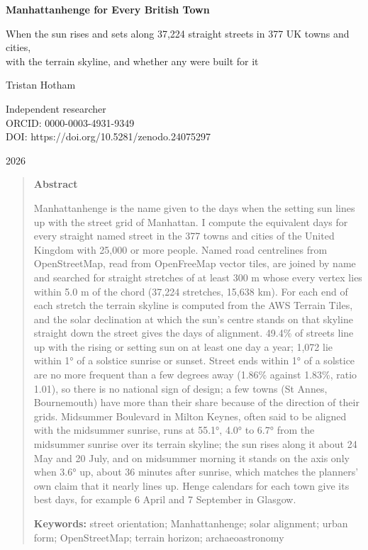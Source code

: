 \documentclass[11pt,a4paper]{article}
\begin{document}
\begin{center}
{\Large\bfseries Manhattanhenge for Every British Town\par}
\vspace{0.4em}
{\large When the sun rises and sets along 37,224 straight streets in 377 UK towns and cities,\\with the terrain skyline, and whether any were built for it\par}
\vspace{1.2em}
{\large Tristan Hotham\par}
\vspace{0.3em}
{\small Independent researcher\\
ORCID: 0000-0003-4931-9349\\
DOI: https://doi.org/10.5281/zenodo.24075297\par}
\vspace{0.8em}
2026
\end{center}

\begin{quote}
\small
\begin{center}\textbf{Abstract}\end{center}
Manhattanhenge is the name given to the days when the setting sun lines up with the street grid of Manhattan. I compute the equivalent days for every straight named street in the 377 towns and cities of the United Kingdom with 25,000 or more people. Named road centrelines from OpenStreetMap, read from OpenFreeMap vector tiles, are joined by name and searched for straight stretches of at least 300 m whose every vertex lies within 5.0 m of the chord (37,224 stretches, 15,638 km). For each end of each stretch the terrain skyline is computed from the AWS Terrain Tiles, and the solar declination at which the sun's centre stands on that skyline straight down the street gives the days of alignment. 49.4\% of streets line up with the rising or setting sun on at least one day a year; 1,072 lie within 1° of a solstice sunrise or sunset. Street ends within 1° of a solstice are no more frequent than a few degrees away (1.86\% against 1.83\%, ratio 1.01), so there is no national sign of design; a few towns (St Annes, Bournemouth) have more than their share because of the direction of their grids. Midsummer Boulevard in Milton Keynes, often said to be aligned with the midsummer sunrise, runs at 55.1°, 4.0° to 6.7° from the midsummer sunrise over its terrain skyline; the sun rises along it about 24 May and 20 July, and on midsummer morning it stands on the axis only when 3.6° up, about 36 minutes after sunrise, which matches the planners' own claim that it nearly lines up. Henge calendars for each town give its best days, for example 6 April and 7 September in Glasgow.

\textbf{Keywords:} street orientation; Manhattanhenge; solar alignment; urban form; OpenStreetMap; terrain horizon; archaeoastronomy
\end{quote}
\end{document}

